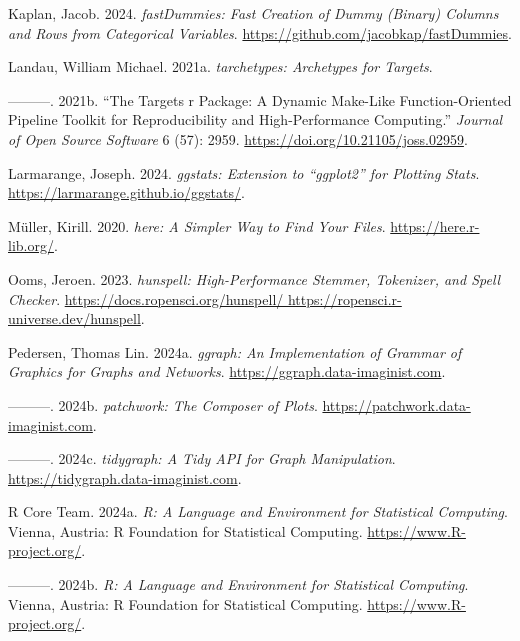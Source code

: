 \documentclass[
]{article}
\newlength{\cslhangindent}
\newlength{\cslentryspacingunit} %
\newenvironment{CSLReferences}[2] %
 {%
  \setlength{\parindent}{0pt}
  \ifodd #1
  \let\oldpar\par
  \def\par{\hangindent=\cslhangindent\oldpar}
  \fi
  \setlength{\parskip}{#2\cslentryspacingunit}
 }%
 {}
\begin{document}
\begin{CSLReferences}{1}{0}
\leavevmode{}%
Kaplan, Jacob. 2024. \emph{{fastDummies}: Fast Creation of Dummy
(Binary) Columns and Rows from Categorical Variables}.
\url{https://github.com/jacobkap/fastDummies}.

\leavevmode{}%
Landau, William Michael. 2021a. \emph{{tarchetypes}: Archetypes for
Targets}.

\leavevmode{}%
---------. 2021b. {``The Targets r Package: A Dynamic Make-Like
Function-Oriented Pipeline Toolkit for Reproducibility and
High-Performance Computing.''} \emph{Journal of Open Source Software} 6
(57): 2959. \url{https://doi.org/10.21105/joss.02959}.

\leavevmode{}%
Larmarange, Joseph. 2024. \emph{{ggstats}: Extension to {``{ggplot2}''}
for Plotting Stats}. \url{https://larmarange.github.io/ggstats/}.

\leavevmode{}%
Müller, Kirill. 2020. \emph{{here}: A Simpler Way to Find Your Files}.
\url{https://here.r-lib.org/}.

\leavevmode{}%
Ooms, Jeroen. 2023. \emph{{hunspell}: High-Performance Stemmer,
Tokenizer, and Spell Checker}.
\href{https://docs.ropensci.org/hunspell/\%0Ahttps://ropensci.r-universe.dev/hunspell}{https://docs.ropensci.org/hunspell/
https://ropensci.r-universe.dev/hunspell}.

\leavevmode{}%
Pedersen, Thomas Lin. 2024a. \emph{{ggraph}: An Implementation of
Grammar of Graphics for Graphs and Networks}.
\url{https://ggraph.data-imaginist.com}.

\leavevmode{}%
---------. 2024b. \emph{{patchwork}: The Composer of Plots}.
\url{https://patchwork.data-imaginist.com}.

\leavevmode{}%
---------. 2024c. \emph{{tidygraph}: A Tidy API for Graph Manipulation}.
\url{https://tidygraph.data-imaginist.com}.

\leavevmode{}%
R Core Team. 2024a. \emph{{R}: A Language and Environment for
Statistical Computing}. Vienna, Austria: R Foundation for Statistical
Computing. \url{https://www.R-project.org/}.

\leavevmode{}%
---------. 2024b. \emph{{R}: A Language and Environment for Statistical
Computing}. Vienna, Austria: R Foundation for Statistical Computing.
\url{https://www.R-project.org/}.


\end{CSLReferences}
\end{document}
